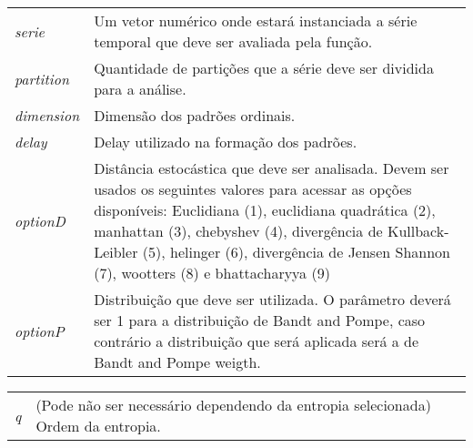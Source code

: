 \begin{table}[!ht]
\begin{center}
\begin{tabularx}{\textwidth}{X X}
\hspace{0.5cm} \textit{serie} \vspace{0.5cm}& Um vetor numérico onde estará instanciada a série temporal que deve ser avaliada pela função.\vspace{0.5cm}\\
\hspace{0.5cm} \textit{partition} \vspace{0.5cm}& Quantidade de partições que a série deve ser dividida para a análise.\vspace{0.5cm}\\
\hspace{0.5cm} \textit{dimension} \vspace{0.5cm}& Dimensão dos padrões ordinais.\vspace{0.5cm}\\
\hspace{0.5cm} \textit{delay} \vspace{0.5cm}& Delay utilizado na formação dos padrões.\vspace{0.5cm}\\
\hspace{0.5cm} \textit{optionD} \vspace{0.5cm}& Distância estocástica que deve ser analisada. Devem ser usados os seguintes valores para acessar as opções disponíveis: Euclidiana (1), euclidiana quadrática (2), manhattan (3), chebyshev (4), divergência de Kullback-Leibler (5), helinger (6), divergência de Jensen Shannon (7), wootters (8) e bhattacharyya (9)\vspace{0.5cm}\\
\hspace{0.5cm} \textit{optionP} \vspace{0.5cm}& Distribuição que deve ser utilizada. O parâmetro deverá ser 1 para a distribuição de Bandt and Pompe, caso contrário a distribuição que será aplicada será a de Bandt and Pompe weigth.\vspace{0.5cm}\\
\end{tabularx}
\end{center}
\end{table} 

\begin{table}[!ht]
\begin{center}
\begin{tabularx}{\textwidth}{X X}
\hspace{0.5cm} \textit{q} \vspace{0.5cm}& (Pode não ser necessário dependendo da entropia selecionada) Ordem da entropia.\vspace{0.5cm}\\
\end{tabularx}
\end{center}
\end{table} 

